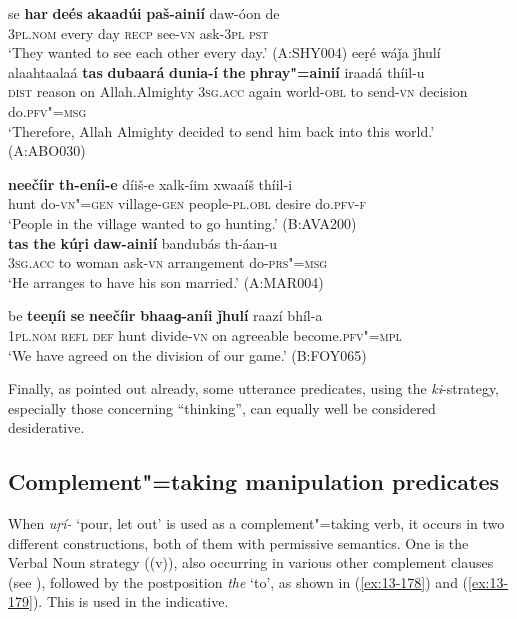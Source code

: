 \ea
\label{ex:13-173}
\gll se \textbf{har} \textbf{deés} \textbf{akaadúi} \textbf{paš-ainií} daw-óon de \\
\textsc{3pl.nom} every day \textsc{recp} see-\textsc{vn} ask-\textsc{3pl} \textsc{pst} \\
\glt `They wanted to see each other every day.' (A:SHY004)
\ex
\label{ex:13-174}
\gll eeṛé wáǰa ǰhulí alaahtaalaá \textbf{tas} \textbf{dubaará} \textbf{dunia-í} \textbf{the} \textbf{phray"=ainií} iraadá thíil-u\\
\textsc{dist} reason on Allah.Almighty \textsc{3sg.acc} again world-\textsc{obl}  to send-\textsc{vn} decision do.\textsc{pfv"=msg}\\
\glt `Therefore, Allah Almighty decided to send him back into this world.' (A:ABO030)

\ex
\label{ex:13-175}
\gll \textbf{neečíir} \textbf{th-eníi-e} díiš-e xalk-íim xwaaíš thíil-i \\
hunt do-\textsc{vn"=gen} village-\textsc{gen} people-\textsc{pl.obl} desire do.\textsc{pfv-f}\\
\glt `People in the village wanted to go hunting.' (B:AVA200)\\

\ex
\label{ex:13-176}
\gll \textbf{tas} \textbf{the} \textbf{kúṛi} \textbf{daw-ainií} bandubás th-áan-u \\
\textsc{3sg.acc} to woman ask-\textsc{vn}  arrangement do-\textsc{prs"=msg} \\
\glt `He arranges to have his son married.' (A:MAR004)

\ex
\label{ex:13-177}
\gll be \textbf{teeṇíi} \textbf{se} \textbf{neečíir} \textbf{bhaaɡ-aníi} \textbf{ǰhulí} raazí bhíl-a\\
\textsc{1pl.nom} \textsc{refl} \textsc{def} hunt divide-\textsc{vn} on agreeable become.\textsc{pfv"=mpl}\\
\glt `We have agreed on the division of our game.' (B:FOY065) 
\z

Finally, as pointed out already, some utterance predicates, using the \textit{ki}-strategy, especially those concerning ``thinking'', can equally well be considered desiderative.


\subsection{Complement"=taking manipulation predicates}
\label{subsec:13-5-3}

 When \textit{uṛí-} `pour, let out' is used as a complement"=taking verb, it occurs in two different constructions, both of them with permissive semantics. One is the Verbal Noun strategy ((v)), also occurring in various other complement clauses (see ), followed by the postposition \textit{the} `to', as shown in (\ref{ex:13-178}) and (\ref{ex:13-179}). This is used in the indicative.

